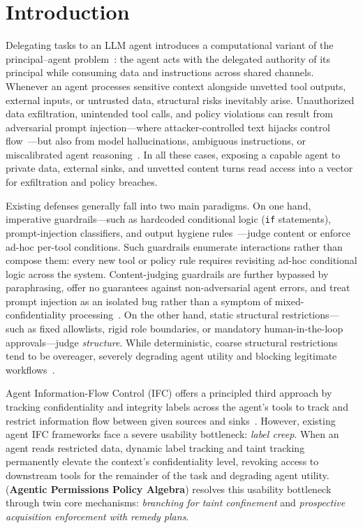 \section{Introduction}\label{sec:intro}

Delegating tasks to an LLM agent introduces a computational variant of the principal--agent problem~\cite{jensen1976theory,ross1973economic}: the agent acts with the delegated authority of its principal while consuming data and instructions across shared channels. Whenever an agent processes sensitive context alongside unvetted tool outputs, external inputs, or untrusted data, structural risks inevitably arise. Unauthorized data exfiltration, unintended tool calls, and policy violations can result from adversarial prompt injection---where attacker-controlled text hijacks control flow~\cite{greshake2023not}---but also from model hallucinations, ambiguous instructions, or miscalibrated agent reasoning~\cite{ji2023survey}. In all these cases, exposing a capable agent to private data, external sinks, and unvetted content turns read access into a vector for exfiltration and policy breaches.

Existing defenses generally fall into two main paradigms. On one hand, imperative guardrails---such as hardcoded conditional logic (\texttt{if} statements), prompt-injection classifiers, and output hygiene rules~\cite{inan2023llama,nvidia2023nemoguardrails}---judge content or enforce ad-hoc per-tool conditions. Such guardrails enumerate interactions rather than compose them: every new tool or policy rule requires revisiting ad-hoc conditional logic across the system. Content-judging guardrails are further bypassed by paraphrasing, offer no guarantees against non-adversarial agent errors, and treat prompt injection as an isolated bug rather than a symptom of mixed-confidentiality processing~\cite{sabelfeld2003language}. On the other hand, static structural restrictions---such as fixed allowlists, rigid role boundaries, or mandatory human-in-the-loop approvals---judge \emph{structure}. While deterministic, coarse structural restrictions tend to be overeager, severely degrading agent utility and blocking legitimate workflows~\cite{Liu2026SafeHarbor,Wang2025AgentSpec,Wei2026From}.

Agent Information-Flow Control (IFC) offers a principled third approach by tracking confidentiality and integrity labels across the agent's tools to track and restrict information flow between given sources and sinks~\cite{camel2025,fides}. However, existing agent IFC frameworks face a severe usability bottleneck: \emph{label creep}. When an agent reads restricted data, dynamic label tracking and taint tracking~\cite{clause2007dytan,bell2014phosphor,schwartz2010all} permanently elevate the context's confidentiality level, revoking access to downstream tools for the remainder of the task and degrading agent utility. \appa{} (\textbf{Agentic Permissions Policy Algebra}) resolves this usability bottleneck through twin core mechanisms: \emph{branching for taint confinement} and \emph{prospective acquisition enforcement with remedy plans}.

